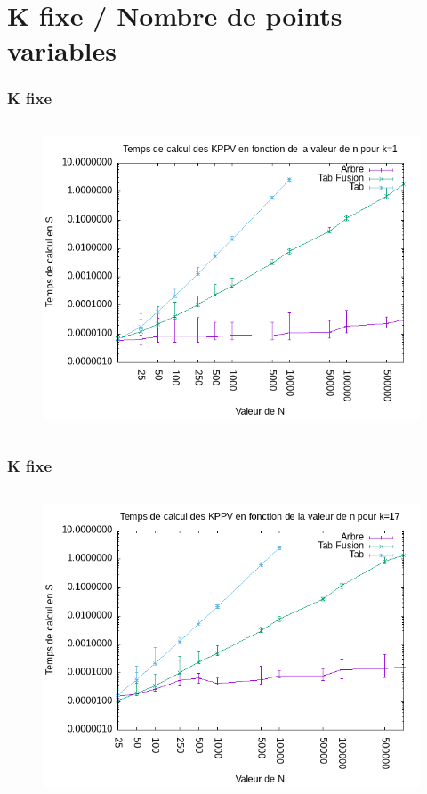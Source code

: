 \documentclass{beamer}
\begin{document}
\section{K fixe / Nombre de points variables}

\begin{frame}
\frametitle{K fixe}
\begin{columns}
    \begin{figure}
      \includegraphics[width=\textwidth]{img_graph/graph_k_1.png}
    \end{figure}
\end{columns}
\end{frame}

\begin{frame}
\frametitle{K fixe}
\begin{columns}
    \begin{figure}
      \includegraphics[width=\textwidth]{img_graph/graph_k_17.png}
    \end{figure}
\end{columns}
\end{frame}
\end{document}
